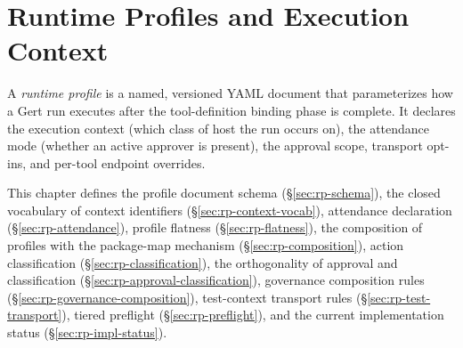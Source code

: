 %
%
%
%

\chapter{Runtime Profiles and Execution Context}
\label{ch:runtime-profiles}

A \emph{runtime profile} is a named, versioned YAML document that parameterizes
how a Gert run executes after the tool-definition binding phase is complete.
It declares the execution context (which class of host the run occurs on),
the attendance mode (whether an active approver is present), the approval
scope, transport opt-ins, and per-tool endpoint overrides.

This chapter defines the profile document schema (\S\ref{sec:rp-schema}),
the closed vocabulary of context identifiers (\S\ref{sec:rp-context-vocab}),
attendance declaration (\S\ref{sec:rp-attendance}), profile flatness
(\S\ref{sec:rp-flatness}), the composition of profiles with the
package-map mechanism (\S\ref{sec:rp-composition}), action classification
(\S\ref{sec:rp-classification}), the orthogonality of approval and
classification (\S\ref{sec:rp-approval-classification}), governance
composition rules (\S\ref{sec:rp-governance-composition}),
test-context transport rules (\S\ref{sec:rp-test-transport}),
tiered preflight (\S\ref{sec:rp-preflight}), and the current
implementation status (\S\ref{sec:rp-impl-status}).

